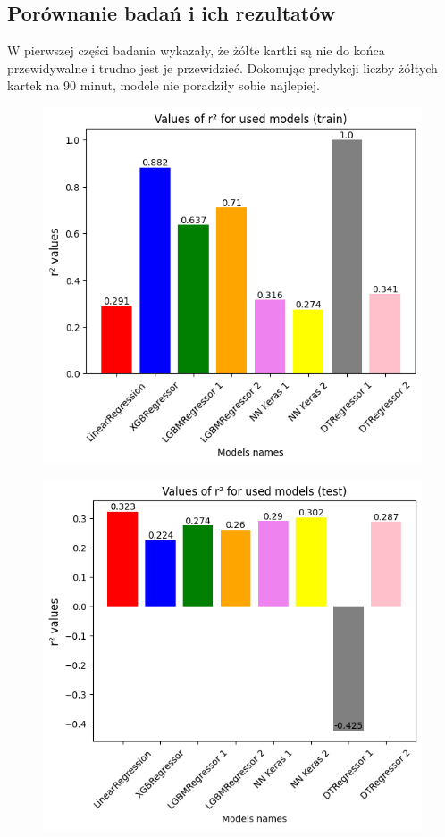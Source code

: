 \documentclass{article}
\begin{document}
\newpage
\subsection{Porównanie badań i ich rezultatów}

W pierwszej części badania wykazały, że żółte kartki są nie do końca przewidywalne i trudno jest je przewidzieć. Dokonując predykcji liczby żółtych kartek na 90 minut, modele nie poradziły sobie najlepiej.

\begin{figure}[H]
  \centering
  \begin{minipage}[b]{0.5\textwidth}
    \centering
    \includegraphics[width=\textwidth]{all_r2_1.png}
    \label{fig:all_r2_train1}
  \end{minipage}%
  \begin{minipage}[b]{0.5\textwidth}
    \centering
    \includegraphics[width=\textwidth]{all_r2_2.png}

\end{minipage}
\end{figure}
\end{document}

